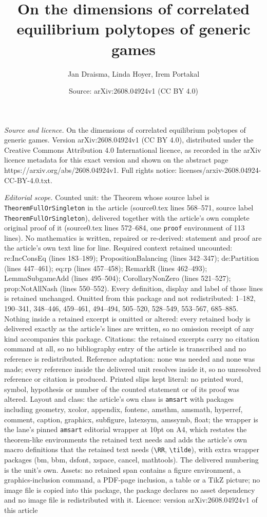 \documentclass[10pt,a4paper]{amsart}
\title[On the dimensions of correlated equilibrium polytopes of gen]{On the dimensions of correlated equilibrium polytopes of generic games}
\author{Jan Draisma, Linda Hoyer, Irem Portakal}
\date{Source: arXiv:2608.04924v1 (CC BY 4.0)}
\begin{document}
\maketitle

\noindent\emph{Source and licence.} On the dimensions of correlated equilibrium polytopes of generic games. Version arXiv:2608.04924v1 (CC BY 4.0), distributed under the Creative Commons Attribution 4.0 International licence, as recorded in the arXiv licence metadata for this exact version and shown on the abstract page https://arxiv.org/abs/2608.04924v1. Full rights notice: licenses/arxiv-2608.04924-CC-BY-4.0.txt.\par\smallskip

\noindent\textit{Editorial scope.} Counted unit: the Theorem whose source label is \texttt{TheoremFullOrSingleton} in the article (source0.tex lines 568--571, source label \texttt{TheoremFullOrSingleton}), delivered together with the article's own complete original proof of it (source0.tex lines 572--684, one \texttt{proof} environment of 113 lines). No mathematics is written, repaired or re-derived: statement and proof are the article's own text line for line. Required context retained uncounted: re:IncConsEq (lines 183--189); PropositionBalancing (lines 342--347); de:Partition (lines 447--461); eq:rp (lines 457--458); RemarkR (lines 462--493); LemmaSubgameAdd (lines 495--504); CorollaryNonZero (lines 521--527); prop:NotAllNash (lines 550--552). Every definition, display and label of those lines is retained unchanged. Omitted from this package and not redistributed: 1--182, 190--341, 348--446, 459--461, 494--494, 505--520, 528--549, 553--567, 685--885. Nothing inside a retained excerpt is omitted or altered: every retained body is delivered exactly as the article's lines are written, so no omission receipt of any kind accompanies this package. Citations: the retained excerpts carry no citation command at all, so no bibliography entry of the article is transcribed and no reference is redistributed. Reference adaptation: none was needed and none was made; every reference inside the delivered unit resolves inside it, so no unresolved reference or citation is produced. Printed slips kept literal: no printed word, symbol, hypothesis or number of the counted statement or of its proof was altered. Layout and class: the article's own class is \texttt{amsart} with packages including geometry, xcolor, appendix, fontenc, amsthm, amsmath, hyperref, comment, caption, graphicx, subfigure, latexsym, amssymb, float; the wrapper is the lane's pinned \texttt{amsart} editorial wrapper at 10pt on A4, which restates the theorem-like environments the retained text needs and adds the article's own macro definitions that the retained text needs (\texttt{\textbackslash RR}, \texttt{\textbackslash tilde}), with extra wrapper packages (bm, bbm, dsfont, xspace, cancel, mathtools). The delivered numbering is the unit's own. Assets: no retained span contains a figure environment, a graphics-inclusion command, a PDF-page inclusion, a table or a TikZ picture; no image file is copied into this package, the package declares no asset dependency and no image file is redistributed with it. Licence: version arXiv:2608.04924v1 of this article 
\end{document}
